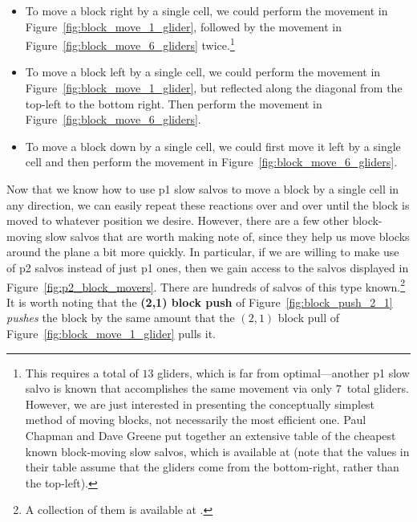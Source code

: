\begin{itemize}
	\item To move a block right by a single cell, we could perform the movement in Figure~\ref{fig:block_move_1_glider}, followed by the movement in Figure~\ref{fig:block_move_6_gliders} twice.\footnote{This requires a total of $13$ gliders, which is far from optimal---another p1 slow salvo is known that accomplishes the same movement via only $7$~total gliders. However, we are just interested in presenting the conceptually simplest method of moving blocks, not necessarily the most efficient one. Paul Chapman and Dave Greene put together an extensive table of the cheapest known block-moving slow salvos, which is available at  (note that the values in their table assume that the gliders come from the bottom-right, rather than the top-left).}\smallskip
	
	\item To move a block left by a single cell, we could perform the movement in Figure~\ref{fig:block_move_1_glider}, but reflected along the diagonal from the top-left to the bottom right. Then perform the movement in Figure~\ref{fig:block_move_6_gliders}.\smallskip
	
	\item To move a block down by a single cell, we could first move it left by a single cell and then perform the movement in Figure~\ref{fig:block_move_6_gliders}.\smallskip
\end{itemize}

Now that we know how to use p1 slow salvos to move a block by a single cell in any direction, we can easily repeat these reactions over and over until the block is moved to whatever position we desire. However, there are a few other block-moving slow salvos that are worth making note of, since they help us move blocks around the plane a bit more quickly. In particular, if we are willing to make use of p2 salvos instead of just p1 ones, then we gain access to the salvos displayed in Figure~\ref{fig:p2_block_movers}. There are hundreds of salvos of this type known.\footnote{A collection of them is available at .} It is worth noting that the \textbf{(2,1) block push} of Figure~\ref{fig:block_push_2_1} \emph{pushes} the block by the same amount that the $(2,1)$ block pull of Figure~\ref{fig:block_move_1_glider} pulls it.


